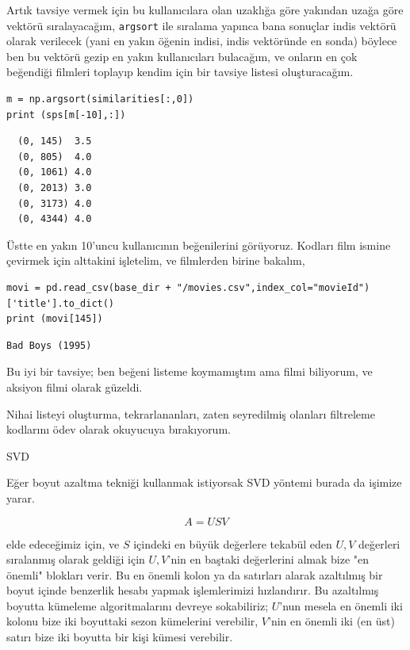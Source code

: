 \documentclass[12pt,fleqn]{article}\usepackage{../../common}
\begin{document}
Artık tavsiye vermek için bu kullanıcılara olan uzaklığa göre yakından uzağa
göre vektörü sıralayacağım, \verb!argsort! ile sıralama yapınca bana sonuçlar
indis vektörü olarak verilecek (yani en yakın öğenin indisi, indis vektöründe en
sonda) böylece ben bu vektörü gezip en yakın kullanıcıları bulacağım, ve onların
en çok beğendiği filmleri toplayıp kendim için bir tavsiye listesi
oluşturacağım.

\begin{verbatim}
m = np.argsort(similarities[:,0])
print (sps[m[-10],:])
\end{verbatim}

\begin{verbatim}
  (0, 145)	3.5
  (0, 805)	4.0
  (0, 1061)	4.0
  (0, 2013)	3.0
  (0, 3173)	4.0
  (0, 4344)	4.0
\end{verbatim}

Üstte en yakın 10'uncu kullanıcının beğenilerini görüyoruz. Kodları film ismine 
çevirmek için alttakini işletelim, ve filmlerden birine bakalım,

\begin{verbatim}
movi = pd.read_csv(base_dir + "/movies.csv",index_col="movieId")['title'].to_dict()
print (movi[145])
\end{verbatim}

\begin{verbatim}
Bad Boys (1995)
\end{verbatim}

Bu iyi bir tavsiye; ben beğeni listeme koymamıştım ama filmi biliyorum,
ve aksiyon filmi olarak güzeldi.

Nihai listeyi oluşturma, tekrarlananları, zaten seyredilmiş olanları filtreleme
kodlarını ödev olarak okuyucuya bırakıyorum.

SVD

Eğer boyut azaltma tekniği kullanmak istiyorsak SVD yöntemi burada da işimize
yarar.

$$ A = USV  $$

elde edeceğimiz için, ve $S$ içindeki en büyük değerlere tekabül eden
$U,V$ değerleri sıralanmış olarak geldiği için $U,V$'nin en baştaki
değerlerini almak bize "en önemli" blokları verir. Bu en önemli kolon
ya da satırları alarak azaltılmış bir boyut içinde benzerlik hesabı
yapmak işlemlerimizi hızlandırır. Bu azaltılmış boyutta kümeleme
algoritmalarını devreye sokabiliriz; $U$'nun mesela en önemli iki
kolonu bize iki boyuttaki sezon kümelerini verebilir, $V$'nin en
önemli iki (en üst) satırı bize iki boyutta bir kişi kümesi verebilir.
\end{document}
